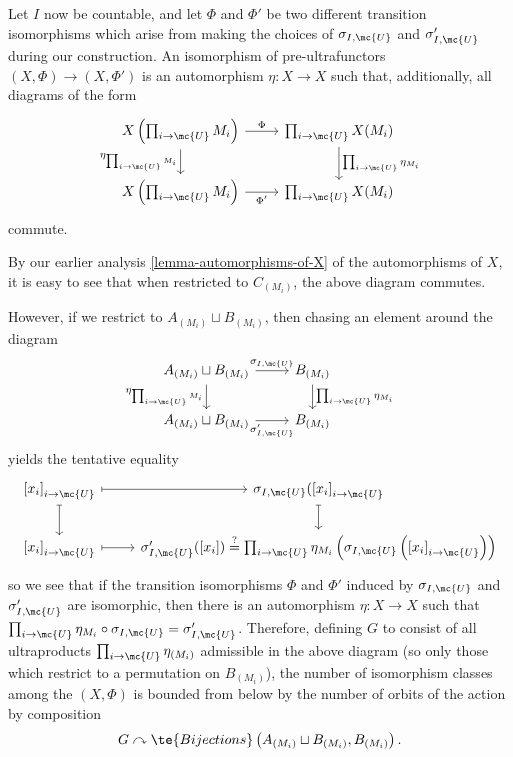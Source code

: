          Let $I$ now be countable, and let $\Phi$ and $\Phi'$ be two different transition isomorphisms which arise from making the choices of $\sigma_{I, \mc{U}}$ and $\sigma'_{I, \mc{U}}$ during our construction. An isomorphism of pre-ultrafunctors $(X, \Phi) \to (X, \Phi')$ is an automorphism $\eta : X \to X$ such that, additionally, all diagrams of the form
         $$
         \begin{tikzcd}[ampersand replacement = \&]
         X\left(\prod_{i \to \mc{U}} M_i \right) \arrow[swap]{d}{\eta_{\prod_{i \to \mc{U}} M_i}} \arrow{r}{\Phi} \& \prod_{i \to \mc{U}} X(M_i) \arrow{d}{\prod_{i \to \mc{U}} \eta_{M_i}} \\
          X \left(\prod_{i \to \mc{U}} M_i \right) \arrow[swap]{r}{\Phi'} \& \prod_{i \to \mc{U}} X(M_i)
           \end{tikzcd}
         $$
         commute.

         By our earlier analysis \ref{lemma-automorphisms-of-X} of the automorphisms of $X$, it is easy to see that when restricted to $C_{(M_i)}$, the above diagram commutes.

         However, if we restrict to $A_{(M_i)} \sqcup B_{(M_i)}$, then chasing an element around the diagram
         $$
         \begin{tikzcd}[ampersand replacement = \&]
        A_{(M_i)} \sqcup B_{(M_i)} \arrow{r}{\sigma_{I, \mc{U}}} \arrow[swap]{d}{\eta_{\prod_{i \to \mc{U}} M_i}}  \& B_{(M_i)} \arrow{d}{\prod_{i \to \mc{U}} \eta_{M_i}}\\
        A_{(M_i)} \sqcup B_{(M_i)} \arrow[swap]{r}{\sigma'_{I, \mc{U}}}          \& B_{(M_i)}
      \end{tikzcd}
      $$
      yields the tentative equality
      $$
      \begin{tikzcd}[ampersand replacement = \&]
        \left[x_i\right]_{i \to \mc{U}} \arrow[mapsto]{r} \arrow[mapsto]{d}\& \sigma_{I, \mc{U}}(\left[x_i\right]_{i \to \mc{U}} \arrow[mapsto]{d}\\
       \left[x_i\right]_{i \to \mc{U}} \arrow[mapsto]{r} \& \sigma'_{I, \mc{U}}(\left[x_i\right]) \overset{?}{=} \prod_{i \to \mc{U}} \eta_{M_i} \left(\sigma_{I, \mc{U}}\left(\left[x_i\right]_{i \to \mc{U}}\right)\right)
        \end{tikzcd}
        $$
        so we see that if the transition isomorphisms $\Phi$ and $\Phi'$ induced by $\sigma_{I, \mc{U}}$ and $\sigma'_{I, \mc{U}}$ are isomorphic, then there is an automorphism $\eta : X \to X$ such that $\prod_{i \to \mc{U}} \eta_{M_i} \circ \sigma_{I, \mc{U}} = \sigma'_{I, \mc{U}}$. Therefore, defining $G$ to consist of all ultraproducts $\prod_{i \to \mc{U}} \eta_{(M_i)}$ admissible in the above diagram (so only those which restrict to a permutation on $B_{(M_i)}$), the number of isomorphism classes among the $(X,\Phi)$ is bounded from below by the number of orbits of the action by composition
        $$
G \curvearrowright \te{Bijections}\left(A_{(M_i)} \sqcup B_{(M_i)}, B_{(M_i)}\right).
$$

